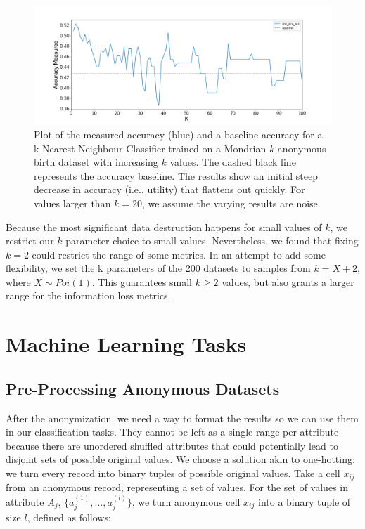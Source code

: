 \begin{figure}
    \centerfloat
    \includegraphics[width=1.2\textwidth]{project/fig/varying_k_birth_mondrian_knn.png}
    \caption{Plot of the measured accuracy (blue) and a baseline accuracy for a k-Nearest Neighbour Classifier trained on a Mondrian $k$-anonymous birth dataset with increasing $k$ values. The dashed black line represents the accuracy baseline. The results show an initial steep decrease in accuracy (i.e., utility) that flattens out quickly. For values larger than $k=20$, we assume the varying results are noise.}
    \label{fig:varying_k_birth_mondrian_knn}
\end{figure}

Because the most significant data destruction happens for small values of $k$, we restrict our $k$ parameter choice to small values. Nevertheless, we found that fixing $k=2$ could restrict the range of some metrics. In an attempt to add some flexibility, we set the k parameters of the 200 datasets to samples from $k = X + 2$, where $X \sim Poi(1)$. This guarantees small $k \geq 2$ values, but also grants a larger range for the information loss metrics.

\section{Machine Learning Tasks}
\subsection{Pre-Processing Anonymous Datasets}
After the anonymization, we need a way to format the results so we can use them in our classification tasks. They cannot be left as a single range per attribute because there are unordered shuffled attributes that could potentially lead to disjoint sets of possible original values. We choose a solution akin to one-hotting: we turn every record into binary tuples of possible original values. Take a cell $x_{ij}$ from an anonymous record, representing a set of values. For the set of values in attribute $A_j$, $\{a_j^{(1)},...,a_j^{(l)}\}$, we turn anonymous cell $x_{ij}$ into a binary tuple of size $l$, defined as follows: 


